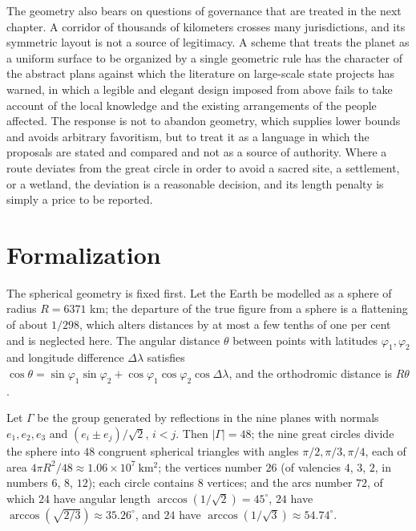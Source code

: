 The geometry also bears on questions of governance that are treated in the next chapter. A corridor of thousands of kilometers crosses many jurisdictions, and its symmetric layout is not a source of legitimacy. A scheme that treats the planet as a uniform surface to be organized by a single geometric rule has the character of the abstract plans against which the literature on large-scale state projects has warned, in which a legible and elegant design imposed from above fails to take account of the local knowledge and the existing arrangements of the people affected. The response is not to abandon geometry, which supplies lower bounds and avoids arbitrary favoritism, but to treat it as a language in which the proposals are stated and compared and not as a source of authority. Where a route deviates from the great circle in order to avoid a sacred site, a settlement, or a wetland, the deviation is a reasonable decision, and its length penalty is simply a price to be reported.

\section*{Formalization}

The spherical geometry is fixed first. Let the Earth be modelled as a sphere of radius $R=6371$ km; the departure of the true figure from a sphere is a flattening of about $1/298$, which alters distances by at most a few tenths of one per cent and is neglected here. The angular distance $\theta$ between points with latitudes $\varphi_1,\varphi_2$ and longitude difference $\Delta\lambda$ satisfies $\cos\theta=\sin\varphi_1\sin\varphi_2+\cos\varphi_1\cos\varphi_2\cos\Delta\lambda$, and the orthodromic distance is $R\theta$.

\begin{proposition}
Let $\Gamma$ be the group generated by reflections in the nine planes with normals $e_1,e_2,e_3$ and $(e_i\pm e_j)/\sqrt2$, $i<j$. Then $|\Gamma|=48$; the nine great circles divide the sphere into $48$ congruent spherical triangles with angles $\pi/2,\pi/3,\pi/4$, each of area $4\pi R^2/48\approx1.06\times10^7\ \mathrm{km^2}$; the vertices number $26$ (of valencies $4$, $3$, $2$, in numbers $6$, $8$, $12$); each circle contains $8$ vertices; and the arcs number $72$, of which $24$ have angular length $\arccos(1/\sqrt2)=45^\circ$, $24$ have $\arccos(\sqrt{2/3})\approx35.26^\circ$, and $24$ have $\arccos(1/\sqrt3)\approx54.74^\circ$.
\end{proposition}

